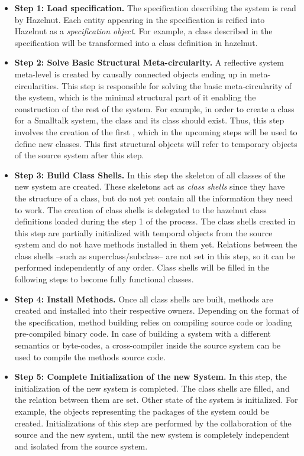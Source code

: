 \begin{itemize}
\item \textbf{Step 1: Load specification.}
The specification describing the system is read by  Hazelnut. Each entity appearing in the specification is reified into Hazelnut as a \emph{specification object}. For example, a class described in the specification will be transformed into a class definition in hazelnut. 

\item \textbf{Step 2: Solve Basic Structural Meta-circularity.}
A reflective system meta-level is created by causally connected objects ending up in meta-circularities.
This step is responsible for solving the basic meta-circularity of the system, which is the minimal structural part of it enabling the construction of the rest of the system.
For example, in order to create a class for a Smalltalk system, the class  and its class should exist. Thus, this step involves the creation of the first , which in the upcoming steps will be used to define new classes.
This first structural objects will refer to temporary objects of the source system after this step.

\item \textbf{Step 3: Build Class Shells.}
In this step the skeleton of all classes of the new system are created. These skeletons act as \emph{class shells} since they have the structure of a class, but do not yet contain all the information they need to work. 
The creation of class shells is delegated to the hazelnut class definitions loaded during the step 1 of the process.
The class shells created in this step are partially initialized with temporal objects from the source system and do not have methods installed in them yet.
Relations between the class shells --such as superclass/subclass-- are not set in this step, so it can be performed independently of any order.
Class shells will be filled in the following steps to become fully functional classes.

\item \textbf{Step 4: Install Methods.}
Once all class shells are built, methods are created and installed into their respective owners. Depending on the format of the specification, method building relies on compiling source code or loading pre-compiled binary code. In case of building a system with a different semantics or byte-codes, a cross-compiler inside the source system can be used to compile the methods source code.

\item \textbf{Step 5: Complete Initialization of the new System.}
In this step, the initialization of the new system is completed.
The class shells are filled, and the relation between them are set.
Other state of the system is initialized. For example, the objects representing the packages of the system could be created.
Initializations of this step are performed by the collaboration of the source and the new system, until the new system is completely independent and isolated from the source system.

\end{itemize}

